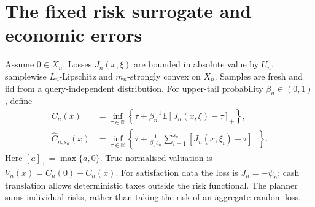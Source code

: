 \documentclass{article}
\begin{document}
\section{The fixed risk surrogate and economic errors}
Assume \(0\in X_n\). Losses \(J_n(x,\xi)\) are bounded in absolute
value by \(U_n\), samplewise \(L_n\)-Lipschitz and
\(m_n\)-strongly convex on \(X_n\). Samples are fresh and iid from a
query-independent distribution. For upper-tail probability
\(\beta_n\in(0,1)\), define
\begin{align}
 C_n(x)&=\inf_{\tau\in\mathbb R}\left\{\tau+
 \beta_n^{-1}\mathbb E[J_n(x,\xi)-\tau]_+\right\},\label{eq:cvar}\\
 \widehat C_{n,s_n}(x)&=\inf_{\tau\in\mathbb R}\left\{\tau+
 \frac1{\beta_ns_n}\sum_{i=1}^{s_n}[J_n(x,\xi_i)-\tau]_+\right\}.
\end{align}
Here \([a]_+=\max\{a,0\}\). True normalised valuation is
\(V_n(x)=C_n(0)-C_n(x)\). For satisfaction data the loss is
\(J_n=-\psi_n\); cash translation allows deterministic taxes outside the
risk functional. The planner sums individual risks, rather than taking
the risk of an aggregate random loss.
\end{document}
